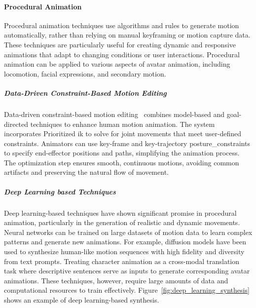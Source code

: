 \documentclass[../../main.tex]{subfiles}
\begin{document}
\paragraph{Procedural Animation}
\label{ch:background_work:sign_language_synthesis:3d_techniques:avatar_animation:procedural_animation}

Procedural animation techniques use algorithms and rules to generate motion automatically, rather than relying on manual keyframing or motion capture data. These techniques are particularly useful for creating dynamic and responsive animations that adapt to changing conditions or user interactions. Procedural animation can be applied to various aspects of avatar animation, including locomotion, facial expressions, and secondary motion.

\subparagraph{Data-Driven Constraint-Based Motion Editing}
\label{ch:background_work:sign_language_synthesis:3d_techniques:avatar_animation:procedural_techniques:data_driven_constraint_based_motion_editing}

Data-driven constraint-based motion editing~\cite{inbook} combines model-based and goal-directed techniques to enhance human motion animation. The system incorporates Prioritized \gls{ik} to solve for joint movements that meet user-defined constraints. Animators can use key-frame and key-trajectory \gls{posture_constraint}s to specify end-effector positions and paths, simplifying the animation process. The optimization step ensures smooth, continuous motions, avoiding common artifacts and preserving the natural flow of movement.

\subparagraph{Deep Learning based Techniques}
\label{ch:background_work:sign_language_synthesis:3d_techniques:avatar_animation:procedural_techniques:deep_learning_based_techniques}

Deep learning-based techniques have shown significant promise in procedural animation, particularly in the generation of realistic and dynamic movements. Neural networks can be trained on large datasets of motion data to learn complex patterns and generate new animations. For example, diffusion models have been used to synthesize human-like motion sequences with high fidelity and diversity from text prompts. Treating character animation as a cross-modal translation task where descriptive sentences serve as inputs to generate corresponding avatar animations. These techniques, however, require large amounts of data and computational resources to train effectively. Figure~\ref{fig:deep_learning_synthesis} shows an example of deep learning-based synthesis.
\end{document}
